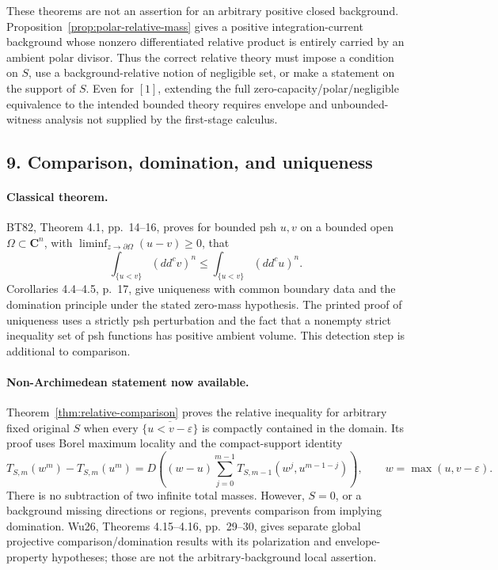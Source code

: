 \documentclass[11pt,a4paper]{article}
\numberwithin{equation}{section}
\theoremstyle{definition}
\theoremstyle{remark}
\begin{document}
These theorems are not an assertion for an arbitrary positive closed
background. Proposition~\ref{prop:polar-relative-mass} gives a positive
integration-current background whose nonzero differentiated relative
product is entirely carried by an ambient polar divisor. Thus the
correct relative theory must impose a condition on \(S\), use a
background-relative notion of negligible set, or make a statement on
the support of \(S\). Even for \([1]\), extending the full
zero-capacity/polar/negligible equivalence to the intended bounded theory
requires envelope and unbounded-witness analysis not supplied by the
first-stage calculus.

\subsection{9. Comparison, domination, and uniqueness}

\paragraph{Classical theorem.}
BT82, Theorem 4.1, pp.~14--16, proves for bounded psh \(u,v\) on a
bounded open \(\Omega\subset\mathbf C^n\), with
\(\liminf_{z\to\partial\Omega}(u-v)\geq0\), that
\[
 \int_{\{u<v\}}(dd^cv)^n\leq
 \int_{\{u<v\}}(dd^cu)^n.
\]
Corollaries 4.4--4.5, p.~17, give uniqueness with common boundary data
and the domination principle under the stated zero-mass hypothesis.
The printed proof of uniqueness uses a strictly psh perturbation and
the fact that a nonempty strict inequality set of psh functions has
positive ambient volume. This detection step is additional to comparison.
\cite[Theorem 4.1, Corollaries 4.4--4.5]{BT82}

\paragraph{Non-Archimedean statement now available.}
Theorem~\ref{thm:relative-comparison} proves the relative inequality for
arbitrary fixed original \(S\) when every
\(\overline{\{u<v-\varepsilon\}}\) is compactly contained in the
domain. Its proof uses Borel maximum locality and the compact-support
identity
\[
 T_{S,m}(w^m)-T_{S,m}(u^m)
  =D\!\left((w-u)\sum_{j=0}^{m-1}
       T_{S,m-1}(w^j,u^{m-1-j})\right),
 \qquad w=\max(u,v-\varepsilon).
\]
There is no subtraction of two infinite total masses. However,
\(S=0\), or a background missing directions or regions, prevents
comparison from implying domination. Wu26, Theorems 4.15--4.16,
pp.~29--30, gives separate global projective comparison/domination
results with its polarization and envelope-property hypotheses; those
are not the arbitrary-background local assertion.\cite[Theorems 4.15--4.16]{Wu26}
\end{document}
